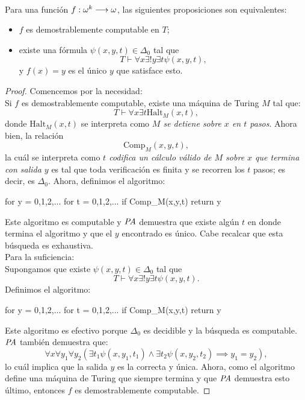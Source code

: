 \begin{lem} {\label{exhaus}} {\cite{demoscomp}}\hspace{0.5cm}\\
    Para una función $f:\omega^k\longrightarrow\omega$, las siguientes proposiciones son equivalentes:
    \begin{itemize}
        \item $f$ es demostrablemente computable en $T$;
        \item existe una fórmula $\psi(x,y,t)\in\Delta_0$ tal que
            \[T\vdash\forall x\exists!y\exists t\psi(x,y,t),\]
            y $f(x)=y$ es el único $y$ que satisface esto.
    \end{itemize}
\end{lem}
\begin{proof}
    Comencemos por la necesidad:\\
    Si $f$ es demostrablemente computable, existe una máquina de Turing $M$ tal que:
    \[T\vdash\forall x\exists t\text{Halt}_M(x,t),\]
    donde $\text{Halt}_M(x,t)$ se interpreta como \textit{$M$ se detiene sobre $x$ en $t$ pasos}. Ahora bien, la relación 
    \[\text{Comp}_M(x,y,t),\]
    la cuál se interpreta como \textit{$t$ codifica un cálculo válido de $M$ sobre $x$ que termina con salida $y$} es tal que toda verificación es finita y se recorren los $t$ pasos; es decir, es $\Delta_0$. Ahora, definimos el algoritmo:
    \begin{center}
    \begin{pseudocodigo}
        for y = 0,1,2,... 
            for t = 0,1,2,... 
                if Comp_M(x,y,t)
                    return y
    \end{pseudocodigo}
    \end{center}
    Este algoritmo es computable y $\textit{PA}$ demuestra que existe algún $t$ en donde termina el algoritmo y que el $y$ encontrado es único. Cabe recalcar que esta búsqueda es exhaustiva.\\
    Para la suficiencia:\\
    Supongamos que existe $\psi(x,y,t)\in\Delta_0$ tal que 
    \[T\vdash\forall x\exists!y\exists t\psi(x,y,t).\]
    Definimos el algoritmo:
    \begin{center}
    \begin{pseudocodigo}
        for y = 0,1,2,... 
            for t = 0,1,2,... 
                if Comp_M(x,y,t)
                    return y
    \end{pseudocodigo}
    \end{center}
    Este algoritmo es efectivo porque $\Delta_0$ es decidible y la búsqueda es computable. $\textit{PA}$ también demuestra que:
    \[\forall x\forall y_1\forall y_2(\exists t_1\psi(x,y_1,t_1)\land \exists t_2\psi(x,y_2,t_2)\implies y_1=y_2),\]
    lo cuál implica que la salida $y$ es la correcta y única. Ahora, como el algoritmo define una máquina de Turing que siempre termina y que $\textit{PA}$ demuestra esto último, entonces $f$ es demostrablemente computable.
\end{proof}
